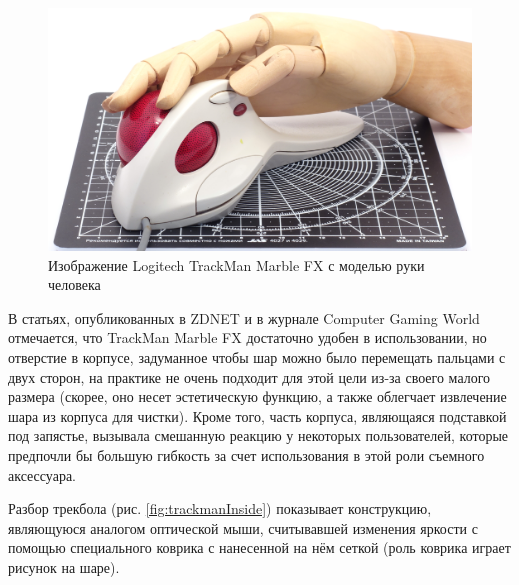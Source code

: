 \documentclass[11pt, a4paper]{article}
\begin{document}
\begin{figure}[h]
    \centering
    \includegraphics[scale=0.6]{1998_logitech_trackman_marble_fx/hand_30.jpg}
    \caption{Изображение Logitech TrackMan Marble FX с моделью руки человека}
    \label{fig:trackmanHand}
\end{figure}

В статьях, опубликованных в ZDNET \cite{zdnet} и в журнале Computer Gaming World \cite{gaming} отмечается, что TrackMan Marble FX достаточно удобен в использовании, но отверстие в корпусе, задуманное чтобы шар можно было перемещать пальцами с двух сторон, на практике не очень подходит для этой цели из-за своего малого размера (скорее, оно несет эстетическую функцию, а также облегчает извлечение шара из корпуса для чистки). Кроме того, часть корпуса, являющаяся подставкой под запястье, вызывала смешанную реакцию у некоторых пользователей, которые предпочли бы большую гибкость за счет использования в этой роли съемного аксессуара.

Разбор трекбола (рис. \ref{fig:trackmanInside}) показывает конструкцию, являющуюся аналогом оптической мыши, считывавшей изменения яркости с помощью специального коврика с нанесенной на нём сеткой (роль коврика играет рисунок на шаре).
\end{document}
